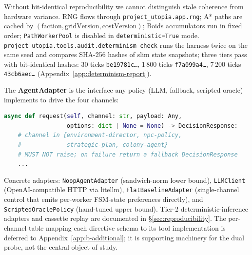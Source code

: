 Without bit-identical reproducibility we cannot distinguish stale
coherence from hardware variance. RNG flows through
\texttt{project\_utopia.app.rng}; A* paths are cached by
$(\text{faction}, \text{gridVersion}, \text{costVersion})$; Boids
accumulators run in fixed order; \texttt{PathWorkerPool} is disabled
in \texttt{deterministic=True} mode. \texttt{project\_utopia.tools.audit.determinism\_check}
runs the harness twice on the same seed and compares SHA-256 hashes
of slim state snapshots; three tiers pass with bit-identical hashes:
30 ticks \texttt{be19781c\ldots}, 1\,800 ticks
\texttt{f7a099a4\ldots}, 7\,200 ticks \texttt{43cb6aec\ldots}
(Appendix~\ref{app:determinism-report}).

The \textbf{AgentAdapter} is the interface any policy (LLM,
fallback, scripted oracle) implements to drive the four channels:

\begin{lstlisting}[language=Python, caption={AgentAdapter contract}]
async def request(self, channel: str, payload: Any,
                  options: dict | None = None) -> DecisionResponse:
    # channel in {environment-director, npc-policy,
    #             strategic-plan, colony-agent}
    # MUST NOT raise; on failure return a fallback DecisionResponse
    ...
\end{lstlisting}

Concrete adapters: \texttt{NoopAgentAdapter} (sandwich-norm lower
bound), \texttt{LLMClient} (OpenAI-compatible HTTP via litellm),
\texttt{FlatBaselineAdapter} (single-channel control that emits
per-worker FSM-state preferences directly), and
\texttt{ScriptedOraclePolicy} (hand-tuned upper bound). Tier-2
deterministic-inference adapters and cassette replay are documented
in \S\ref{sec:reproducibility}. The per-channel table mapping each
directive schema to its tool implementation is deferred to
Appendix~\ref{app:b-additional}; it is supporting machinery for the
dual probe, not the central object of study.
